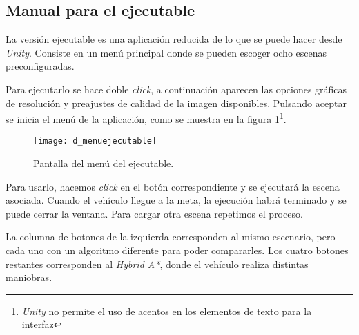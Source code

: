 \subsection{Manual para el ejecutable}
La versión ejecutable es una aplicación reducida de lo que se puede hacer desde \textit{Unity}. Consiste en un menú principal donde se pueden escoger ocho escenas preconfiguradas.

Para ejecutarlo se hace doble \textit{click}, a continuación aparecen las opciones gráficas de resolución y preajustes de calidad de la imagen disponibles. Pulsando aceptar se inicia el menú de la aplicación, como se muestra en la figura \ref{fig:dmenuejecutable}\footnote{\textit{Unity} no permite el uso de acentos en los elementos de texto para la interfaz}.

\begin{figure}[htpb]
    \centering
    \texttt{[image: d\_menuejecutable]}
    \caption[Pantalla del menú del ejecutable]{Pantalla del menú del ejecutable.}
    \label{fig:dmenuejecutable}
\end{figure}

Para usarlo, hacemos \textit{click} en el botón correspondiente y se ejecutará la escena asociada. Cuando el vehículo llegue a la meta, la ejecución habrá terminado y se puede cerrar la ventana. Para cargar otra escena repetimos el proceso.

La columna de botones de la izquierda corresponden al mismo escenario, pero cada uno con un algoritmo diferente para poder compararles. Los cuatro botones restantes corresponden al \textit{Hybrid A*}, donde el vehículo realiza distintas maniobras.

